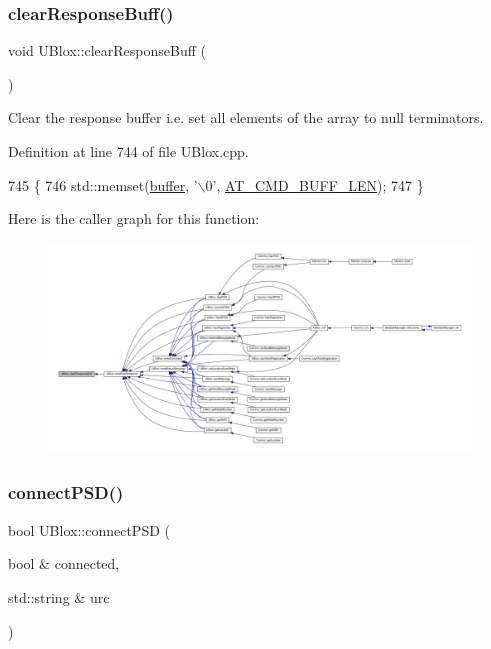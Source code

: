 \subsubsection{\texorpdfstring{clear\+Response\+Buff()}{clearResponseBuff()}}
{\footnotesize\ttfamily void U\+Blox\+::clear\+Response\+Buff (\begin{DoxyParamCaption}{ }\end{DoxyParamCaption})\hspace{0.3cm}{\ttfamily [private]}}

Clear the response buffer i.\+e. set all elements of the array to null terminators. 

Definition at line 744 of file U\+Blox.\+cpp.


\begin{DoxyCode}
745 \{
746     std::memset(\hyperlink{class_u_blox_a6ca4b90f3dc4e856181dce1ebda6f82c}{buffer}, \textcolor{charliteral}{'\(\backslash\)0'}, \hyperlink{_u_blox_8h_aad458adf8f40cbcc1074061f226a112e}{AT\_CMD\_BUFF\_LEN});
747 \}
\end{DoxyCode}
Here is the caller graph for this function\+:\nopagebreak
\begin{figure}[H]
\begin{center}
\leavevmode
\includegraphics[width=350pt]{da/df6/class_u_blox_afc846fbcb1cbd49057b5ce39cd0e0dd6_icgraph}
\end{center}
\end{figure}
\mbox{\label{class_u_blox_ac250bd4aea14e09b3a2595c2b8eda18a}} 
\subsubsection{\texorpdfstring{connect\+P\+S\+D()}{connectPSD()}}
{\footnotesize\ttfamily bool U\+Blox\+::connect\+P\+SD (\begin{DoxyParamCaption}\item[{bool \&}]{connected,  }\item[{std\+::string \&}]{urc }\end{DoxyParamCaption})}

